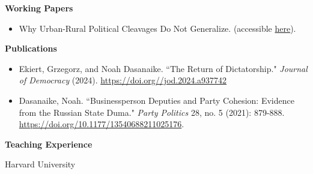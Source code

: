 \documentclass[12pt]{article}
\begin{document}
\begin{footnotesize}
\vspace{5mm} 




{\bf {\normalsize Working Papers}}

\vspace{3mm} 

\begin{itemize}[noitemsep,nolistsep]

\item Why Urban-Rural Political Cleavages Do Not Generalize. (accessible \href{https://www.dropbox.com/scl/fi/f5ol59b0n9exxebt3un5v/Dasanaike_Urban_Rural_2025.pdf?rlkey=m1xcfrvl7ey82k7d5kaakkci3&e=1&st=mjmzzuki&dl=0}{here}).

\end{itemize}

\vspace{5mm} 





{\bf {\normalsize Publications}}

\vspace{3mm} 

\begin{itemize}[noitemsep,nolistsep]

\item Ekiert, Grzegorz, and Noah Dasanaike. ``The Return of Dictatorship." \emph{Journal of Democracy} (2024). \href{https://noahdasanaike.github.io/research/dasanaike_ekiert_2024.pdf}{https://doi.org//\allowbreak jod.2024.\allowbreak a937742}

\item Dasanaike, Noah. ``Businessperson Deputies and Party Cohesion: Evidence from the Russian State Duma." \emph{Party Politics} 28, no. 5 (2021): 879-888. \href{https://noahdasanaike.github.io/research/dasanaike_2021_duma.pdf}{https://doi.org/10.1177/13540688211025176}.

\end{itemize}

\vspace{5mm} 




{\bf {\normalsize Teaching Experience}}

\vspace{3mm} 

Harvard University

\vspace{1.5mm} 

\begin{itemize}


\end{itemize}
\end{footnotesize}
\end{document}
